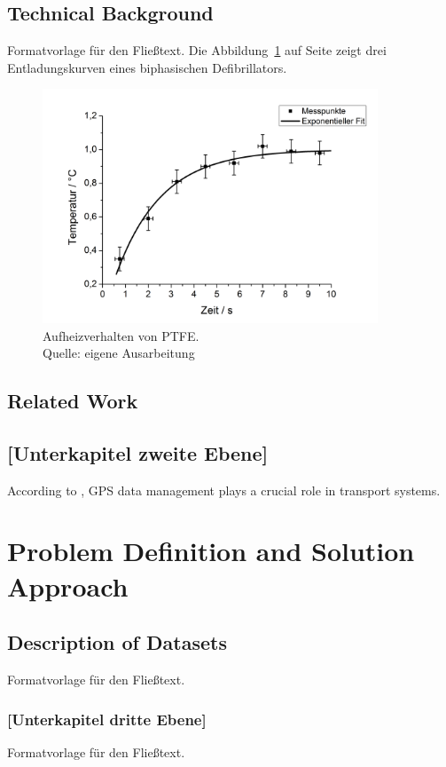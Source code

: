 \documentclass[a4paper,12pt,twoside]{scrreprt}
\begin{document}
\section{Technical Background}
Formatvorlage für den Fließtext. Die Abbildung~\ref{fig:ex} auf Seite \pageref{fig:ex} zeigt drei Entladungskurven eines biphasischen Defibrillators.
\begin{figure}[htb]
  \centering
  \includegraphics[width=10cm]{Abbildungen/Amann_TechnAbb}
  \caption[Aufheizverhalten von PTFE]{Aufheizverhalten von PTFE. \\Quelle: eigene Ausarbeitung}
 \label{fig:ex}
\end{figure}


\section{Related Work}






\section{[Unterkapitel zweite Ebene]}

According to \cite{9615047}, GPS data management plays a crucial role in transport systems.

\chapter{Problem Definition and Solution Approach}

\section{Description of Datasets}
Formatvorlage für den Fließtext.

\subsection{[Unterkapitel dritte Ebene]}
Formatvorlage für den Fließtext.
\end{document}
